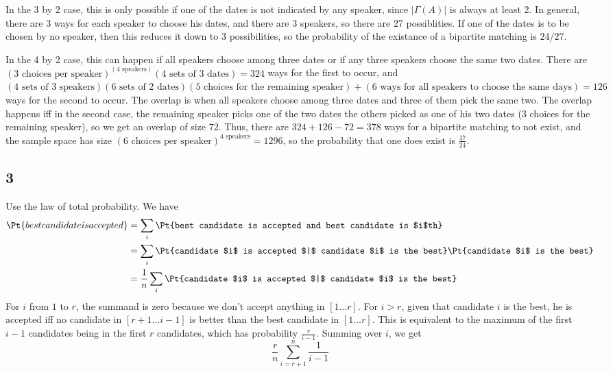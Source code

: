 \documentclass{article}
\begin{document}
In the 3 by 2 case, this is only possible if one of the dates is not indicated by any speaker, since $|\Gamma(A)|$ is always at least 2. In general, there are 3 ways for each speaker to choose his dates, and there are 3 speakers, so there are 27 possiblities. If one of the dates is to be chosen by no speaker, then this reduces it down to 3 possibilities, so the probability of the existance of a bipartite matching is $24/27$.

In the 4 by 2 case, this can happen if all speakers choose among three dates or if any three speakers choose the same two dates. There are $(3\text{ choices per speaker})^{(4\text{ speakers})}(4\text{ sets of 3 dates})=324$ ways for the first to occur, and $(4\text{ sets of 3 speakers})(6\text{ sets of 2 dates})(5\text{ choices for the remaining speaker})+(6\text{ ways for all speakers to choose the same days})=126$ ways for the second to occur. The overlap is when all speakers choose among three dates and three of them pick the same two. The overlap happens iff in the second case, the remaining speaker picks one of the two dates the others picked as one of his two dates (3 choices for the remaining speaker), so we get an overlap of size $72$. Thus, there are $324+126-72=378$ ways for a bipartite matching to not exist, and the sample space has size $(6\text{ choices per speaker})^{4\text{ speakers}}=1296$, so the probability that one does exist is $\frac{17}{24}$.
\subsection*{3}
Use the law of total probability. We have 
\begin{align*}
\Pt{best candidate is accepted}&=\sum_i\Pt{best candidate is accepted and best candidate is $i$th}\\
&=\sum_i\Pt{candidate $i$ is accepted $|$ candidate $i$ is the best}\Pt{candidate $i$ is the best}\\
&=\frac{1}{n}\sum_i\Pt{candidate $i$ is accepted $|$ candidate $i$ is the best}
\end{align*}
For $i$ from $1$ to $r$, the summand is zero because we don't accept anything in $[1\ldots r]$. For $i>r$, given that candidate $i$ is the best, he is accepted iff no candidate in $[r+1\ldots i-1]$ is better than the best candidate in $[1\ldots r]$. This is equivalent to the maximum of the first $i-1$ candidates being in the first $r$ candidates, which has probability $\frac{r}{i-1}$. Summing over $i$, we get 
$$\frac{r}{n}\sum_{i=r+1}^n\frac{1}{i-1}$$
\end{document}
